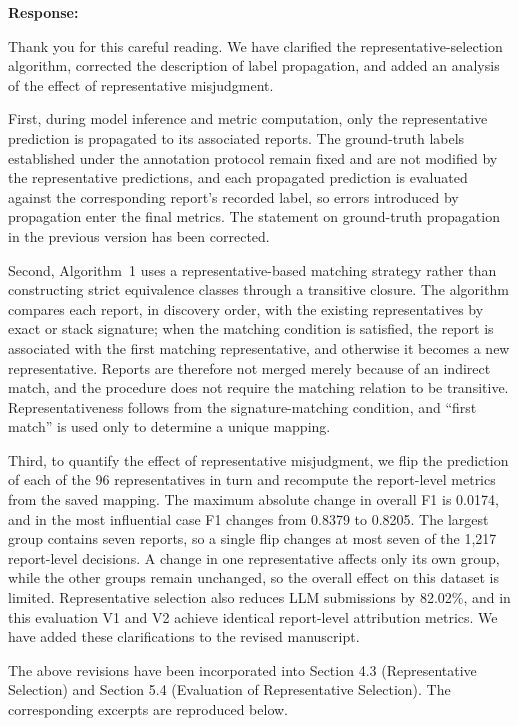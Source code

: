 \documentclass[onecolumn,11pt]{article}
\newcommand{\secr}[2]{\par\mySep \noindent \textsf{\textbf{#1 }}{#2}\par}
\newcommand{\mySep}{\vspace{8pt}}
\begin{document}
\secr{Response:}{Thank you for this careful reading. We have clarified the representative-selection algorithm, corrected the description of label propagation, and added an analysis of the effect of representative misjudgment.

First, during model inference and metric computation, only the representative prediction is propagated to its associated reports. The ground-truth labels established under the annotation protocol remain fixed and are not modified by the representative predictions, and each propagated prediction is evaluated against the corresponding report's recorded label, so errors introduced by propagation enter the final metrics. The statement on ground-truth propagation in the previous version has been corrected.

Second, Algorithm~1 uses a representative-based matching strategy rather than constructing strict equivalence classes through a transitive closure. The algorithm compares each report, in discovery order, with the existing representatives by exact or stack signature; when the matching condition is satisfied, the report is associated with the first matching representative, and otherwise it becomes a new representative. Reports are therefore not merged merely because of an indirect match, and the procedure does not require the matching relation to be transitive. Representativeness follows from the signature-matching condition, and ``first match'' is used only to determine a unique mapping.

Third, to quantify the effect of representative misjudgment, we flip the prediction of each of the 96 representatives in turn and recompute the report-level metrics from the saved mapping. The maximum absolute change in overall F1 is 0.0174, and in the most influential case F1 changes from 0.8379 to 0.8205. The largest group contains seven reports, so a single flip changes at most seven of the 1,217 report-level decisions. A change in one representative affects only its own group, while the other groups remain unchanged, so the overall effect on this dataset is limited. Representative selection also reduces LLM submissions by 82.02\%, and in this evaluation V1 and V2 achieve identical report-level attribution metrics. We have added these clarifications to the revised manuscript.

The above revisions have been incorporated into Section 4.3 (Representative Selection) and Section 5.4 (Evaluation of Representative Selection). The corresponding excerpts are reproduced below.}
\end{document}
